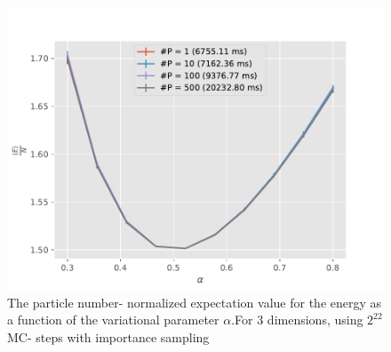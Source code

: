 \documentclass[11pt,a4paper,titlepage]{article}
\begin{document}
\begin{figure}[H]
\centering

\includegraphics[trim=0cm 0.0cm 0cm 1.0cm, clip=true,scale = 0.7]{HarmonicOscillator_SimpleGaussian_D3_2pow22_task_C_1_NoTitle.pdf}
\caption[No interaction, importance sampling (3D)]{The particle number- normalized expectation value for the energy as a function of the variational parameter $\alpha$.For 3 dimensions, using $2^{22}$ MC- steps  with importance sampling}\label{imp3d}
\end{figure}
\end{document}
